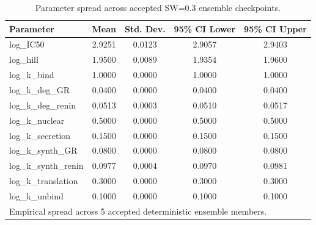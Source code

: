 \begin{table}[htbp]
\centering
\caption{Parameter spread across accepted SW=0.3 ensemble checkpoints.}
\label{tab:parameter_spread}
\begin{tabular}{lcccc}
\hline
\textbf{Parameter} & \textbf{Mean} & \textbf{Std. Dev.} & \textbf{95\% CI Lower} & \textbf{95\% CI Upper} \\
\hline
log_IC50 & 2.9251 & 0.0123 & 2.9057 & 2.9403 \\
log_hill & 1.9500 & 0.0089 & 1.9354 & 1.9600 \\
log_k_bind & 1.0000 & 0.0000 & 1.0000 & 1.0000 \\
log_k_deg_GR & 0.0400 & 0.0000 & 0.0400 & 0.0400 \\
log_k_deg_renin & 0.0513 & 0.0003 & 0.0510 & 0.0517 \\
log_k_nuclear & 0.5000 & 0.0000 & 0.5000 & 0.5000 \\
log_k_secretion & 0.1500 & 0.0000 & 0.1500 & 0.1500 \\
log_k_synth_GR & 0.0800 & 0.0000 & 0.0800 & 0.0800 \\
log_k_synth_renin & 0.0977 & 0.0004 & 0.0970 & 0.0981 \\
log_k_translation & 0.3000 & 0.0000 & 0.3000 & 0.3000 \\
log_k_unbind & 0.1000 & 0.0000 & 0.1000 & 0.1000 \\
\hline
\multicolumn{5}{l}{\small Empirical spread across 5 accepted deterministic ensemble members.} \\
\end{tabular}
\end{table}
